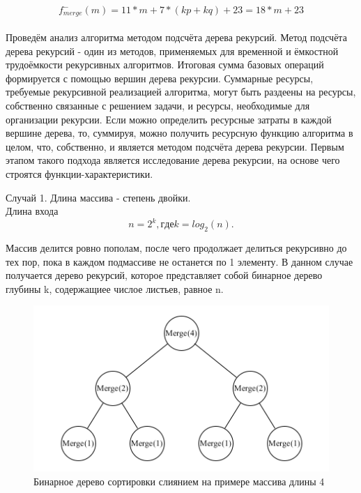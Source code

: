 \documentclass[12pt,a4paper]{scrartcl}
\begin{document}
		\begin{equation}
			\label{eq2.2}
			f_{merge}^-(m) = 11*m + 7*(kp + kq) + 23 = 18*m + 23
		\end{equation} \\

		Проведём анализ алгоритма методом подсчёта дерева рекурсий. Метод подсчёта дерева рекурсий - один из методов, применяемых для временной и ёмкостной трудоёмкости рекурсивных алгоритмов. Итоговая сумма базовых операций формируется с помощью вершин дерева рекурсии. Суммарные ресурсы, требуемые рекурсивной реализацией алгоритма, могут быть раздеены на ресурсы, собственно связанные с решением задачи, и ресурсы, необходимые для организации рекурсии. Если можно определить ресурсные затраты в каждой вершине дерева, то, суммируя, можно получить ресурсную функцию алгоритма в целом, что, собственно, и является методом подсчёта дерева рекурсии. Первым этапом такого подхода является исследование дерева рекурсии, на основе чего строятся функции-характеристики. \cite{Tree}

		Случай 1. Длина массива - степень двойки. \\
		Длина входа 
		\begin{equation}
			\label{eq2.3}
			n = 2^k, где k = log_2(n).
		\end{equation}

		Массив делится ровно пополам, после чего продолжает делиться рекурсивно до тех пор, пока в каждом подмассиве не останется по 1 элементу. В данном случае получается дерево рекурсий, которое представляет собой бинарное дерево глубины k, содержащиее числое листьев, равное n. 
		
		\begin{figure}[h!]
			\centering
			\includegraphics[width=\linewidth]{1.png}
			\caption{Бинарное дерево сортировки слиянием на примере массива длины 4}
			\label{graph2.11}
		\end{figure}
		
\end{document}
